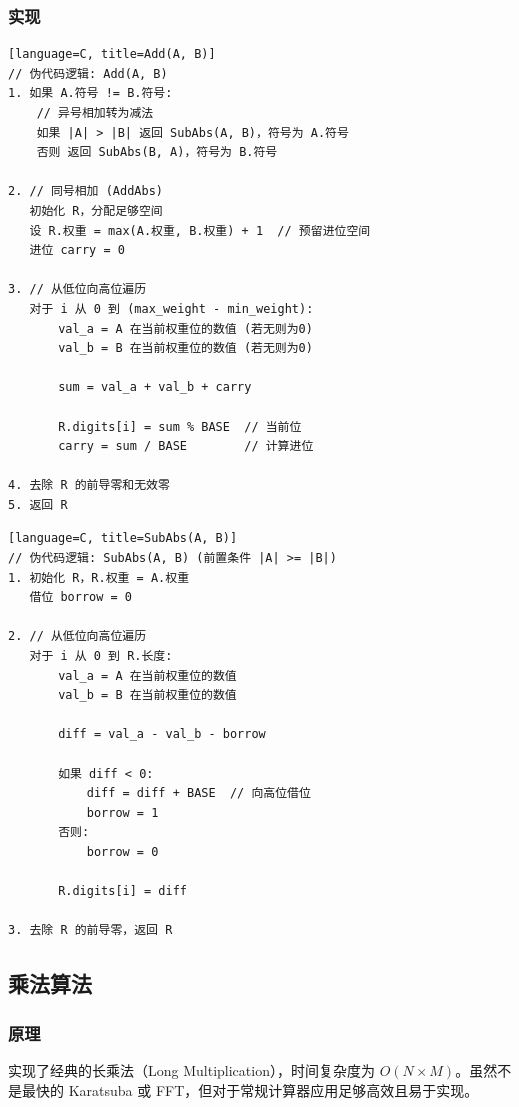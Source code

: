 \documentclass[UTF8]{ctexart}
\begin{document}
\subsubsection{实现}
\begin{lstlisting}[language=C, title=Add(A, B)]
// 伪代码逻辑: Add(A, B)
1. 如果 A.符号 != B.符号:
    // 异号相加转为减法
    如果 |A| > |B| 返回 SubAbs(A, B)，符号为 A.符号
    否则 返回 SubAbs(B, A)，符号为 B.符号

2. // 同号相加 (AddAbs)
   初始化 R，分配足够空间
   设 R.权重 = max(A.权重, B.权重) + 1  // 预留进位空间
   进位 carry = 0

3. // 从低位向高位遍历
   对于 i 从 0 到 (max_weight - min_weight):
       val_a = A 在当前权重位的数值 (若无则为0)
       val_b = B 在当前权重位的数值 (若无则为0)
       
       sum = val_a + val_b + carry
       
       R.digits[i] = sum % BASE  // 当前位
       carry = sum / BASE        // 计算进位

4. 去除 R 的前导零和无效零
5. 返回 R
\end{lstlisting}

\begin{lstlisting}[language=C, title=SubAbs(A, B)]
// 伪代码逻辑: SubAbs(A, B) (前置条件 |A| >= |B|)
1. 初始化 R，R.权重 = A.权重
   借位 borrow = 0

2. // 从低位向高位遍历
   对于 i 从 0 到 R.长度:
       val_a = A 在当前权重位的数值
       val_b = B 在当前权重位的数值
       
       diff = val_a - val_b - borrow
       
       如果 diff < 0:
           diff = diff + BASE  // 向高位借位
           borrow = 1
       否则:
           borrow = 0
           
       R.digits[i] = diff

3. 去除 R 的前导零，返回 R
\end{lstlisting}


\subsection{乘法算法}
\subsubsection{原理}
实现了经典的长乘法（Long Multiplication），时间复杂度为 $O(N \times M)$。虽然不是最快的 Karatsuba 或 FFT，但对于常规计算器应用足够高效且易于实现。
\end{document}
